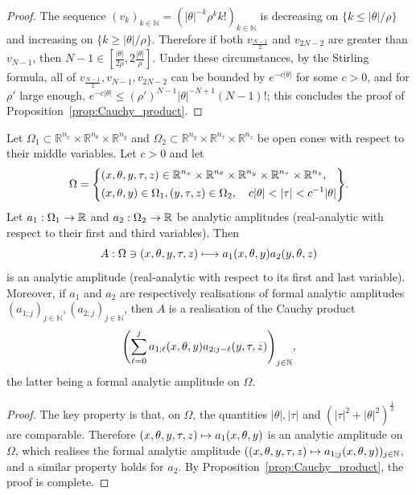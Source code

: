 \documentclass[10pt]{amsart}
\theoremstyle{definition}\newtheorem{defi}[theo]{Definition}\newtheorem{rema}[theo]{Remark}\newtheorem{exam}[theo]{Example}\newtheorem{exem}[theo]{Example}\newtheorem{nota}[theo]{Notation}
\newcommand\1{\mathds{1}}
\newcommand{\R}{\mathbb{R}}
\newcommand{\N}{\mathbb{N}}
\renewcommand*{\to}{\mathchoice{\longrightarrow}{\rightarrow}{\rightarrow}{\rightarrow}}
\let\oldmapsto\mapsto
\renewcommand*{\mapsto}{\mathchoice{\longmapsto}{\oldmapsto}{\oldmapsto}{\oldmapsto}}
\let\originalleft\left
\let\originalright\right
\renewcommand{\left}{\mathopen{}\mathclose\bgroup\originalleft}
\renewcommand{\right}{\aftergroup\egroup\originalright}
\begin{document}
\begin{proof}
The sequence $(v_k)_{k\in \N}=(|\theta|^{-k}\rho^kk!)_{k\in \N}$ is decreasing on $\{k\leq |\theta|/\rho\}$ and increasing on $\{k\geq |\theta|/\rho\}$. Therefore if both $v_{\frac{N-1}{2}}$ and $v_{2N-2}$ are greater than $v_{N-1}$, then $N-1\in [\frac{|\theta|}{2\rho},2\frac{|\theta|}{\rho}]$. Under these circumstances, by the Stirling formula, all of $v_{\frac{N-1}{2}},v_{N-1},v_{2N-2}$ can be bounded by $e^{-c|\theta|}$ for some $c>0$, and for $\rho'$ large enough, $e^{-c|\theta|}\leq (\rho')^{N-1}|\theta|^{-N+1}(N-1)!$; this concludes the proof of Proposition~\ref{prop:Cauchy_product}.
\end{proof}

\begin{prop}\label{prop:product_preparation}
Let $\Omega_1\subset \R^{n_x}\times \R^{n_{\theta}}\times
\R^{n_y}$ and $\Omega_2\subset \R^{n_y}\times \R^{n_{\tau}}\times
\R^{n_z}$ be open cones with respect to their middle variables. Let $c>0$ and let
\begin{equation*}
\Omega=\left\{
\begin{aligned}
&(x,\theta,y,\tau,z)\in \R^{n_x}\times \R^{n_{\theta}}\times
\R^{n_y}\times \R^{n_{\tau}}\times
\R^{n_z},\\ &(x,\theta,y)\in \Omega_1,(y,\tau,z)\in \Omega_2,\quad c|\theta|<|\tau|<c^{-1}|\theta|
\end{aligned}
\right\}.
\end{equation*}
Let $a_1:\Omega_1\to \R$ and $a_2:\Omega_2\to \R$ be analytic amplitudes (real-analytic with respect to their first and third variables). Then
\[
A:\Omega\ni (x,\theta,y,\tau,z)\mapsto a_1(x,\theta,y)a_2(y,\theta,z)
\]
is an analytic amplitude (real-analytic with respect to its first and last variable). Moreover, if $a_1$ and $a_2$ are respectively realisations of formal analytic amplitudes $(a_{1;j})_{j\in
\N},(a_{2;j})_{j\in \N}$, then $A$ is a realisation of the Cauchy product
\[
\left(\sum_{\ell=0}^ja_{1;\ell}(x,\theta,y)a_{2;j-\ell}(y,\tau,z)\right)_{j\in
\N},
\]
the latter being a formal analytic amplitude on $\Omega$.
\end{prop}
\begin{proof}
The key property is that, on $\Omega$, the quantities $|\theta|,|\tau|$ and $(|\tau|^2+|\theta|^2)^{\frac 12}$ are comparable. Therefore $(x,\theta,y,\tau,z)\mapsto a_1(x,\theta,y)$ is an analytic amplitude on $\Omega$, which realises the formal analytic amplitude $((x,\theta,y,\tau,z)\mapsto a_{1;j}(x,\theta,y))_{j\in \N}$, and a similar property holds for $a_2$. By Proposition~\ref{prop:Cauchy_product}, the proof is complete.
\end{proof}
\end{document}
